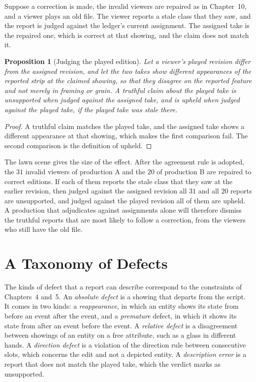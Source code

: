 \documentclass[11pt,twoside,openright]{book}
\theoremstyle{plain}
\newtheorem{proposition}[theorem]{Proposition}
\theoremstyle{definition}
\theoremstyle{remark}
\begin{document}
Suppose a correction is made, the invalid viewers are repaired as in Chapter~10, and a viewer plays an old file. The viewer reports a stale class that they saw, and the report is judged against the ledger's current assignment. The assigned take is the repaired one, which is correct at that showing, and the claim does not match it.

\begin{proposition}[Judging the played edition]\label{prop:played}
Let a viewer's played revision differ from the assigned revision, and let the two takes show different appearances of the reported strip at the claimed showing, so that they disagree on the reported feature and not merely in framing or grain. A truthful claim about the played take is unsupported when judged against the assigned take, and is upheld when judged against the played take, if the played take was stale there.
\end{proposition}

\begin{proof}
A truthful claim matches the played take, and the assigned take shows a different appearance at that showing, which makes the first comparison fail. The second comparison is the definition of upheld.
\end{proof}

The lawn scene gives the size of the effect. After the agreement rule is adopted, the $31$ invalid viewers of production A and the $20$ of production B are repaired to correct editions. If each of them reports the stale class that they saw at the earlier revision, then judged against the assigned revision all $31$ and all $20$ reports are unsupported, and judged against the played revision all of them are upheld. A production that adjudicates against assignments alone will therefore dismiss the truthful reports that are most likely to follow a correction, from the viewers who still have the old file.

\section{A Taxonomy of Defects}\label{sec:taxonomy}

The kinds of defect that a report can describe correspond to the constraints of Chapters~4 and~5. An \emph{absolute defect} is a showing that departs from the script. It comes in two kinds: a \emph{reappearance}, in which an entity shows its state from before an event after the event, and a \emph{premature} defect, in which it shows its state from after an event before the event. A \emph{relative defect} is a disagreement between showings of an entity on a free attribute, such as a glass in different hands. A \emph{direction defect} is a violation of the direction rule between consecutive slots, which concerns the edit and not a depicted entity. A \emph{description error} is a report that does not match the played take, which the verdict marks as unsupported.
\end{document}
